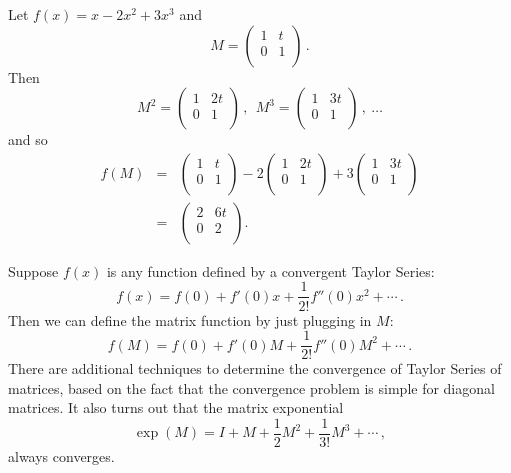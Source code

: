 \begin{example}
Let $f(x) = x - 2x^2 + 3x^3$
and $$M=\begin{pmatrix}
1 & t \\
0 & 1 \\
\end{pmatrix}\, .$$  
Then 
\[
M^2 = \begin{pmatrix}
1 & 2t \\
0 & 1 \\
\end{pmatrix}\, ,\:\:
M^3 = \begin{pmatrix}
1 & 3t \\
0 & 1 \\
\end{pmatrix}\, ,\: \ldots
\]
and so 
\begin{eqnarray*}
f(M) &=& \begin{pmatrix}
	1 & t \\
	0 & 1 \\
	\end{pmatrix} 
- 2 \begin{pmatrix}
	1 & 2t \\
	0 & 1 \\
	\end{pmatrix} 
+ 3 \begin{pmatrix}
	1 & 3t \\
	0 & 1 \\
	\end{pmatrix} \\
&=& \begin{pmatrix}
	2 & 6t \\
	0 & 2 \\
	\end{pmatrix}.
\end{eqnarray*}
\end{example}

Suppose $f(x)$ is any function defined by a convergent Taylor Series:
\[
f(x) = f(0) + f'(0)x + \frac{1}{2!}f''(0)x^2 + \cdots\, .
\]
Then we can define the matrix function by just plugging in $M$:
\[
f(M) = f(0) + f'(0)M + \frac{1}{2!}f''(0)M^2 + \cdots\, .
\]
There are additional techniques to determine the convergence of Taylor Series of matrices, based on the fact that the convergence problem is simple for diagonal matrices.  It also turns out that the matrix exponential
$$\exp (M) = I + M + \frac{1}{2}M^2 + \frac{1}{3!}M^3 + \cdots\, ,$$ always converges.



